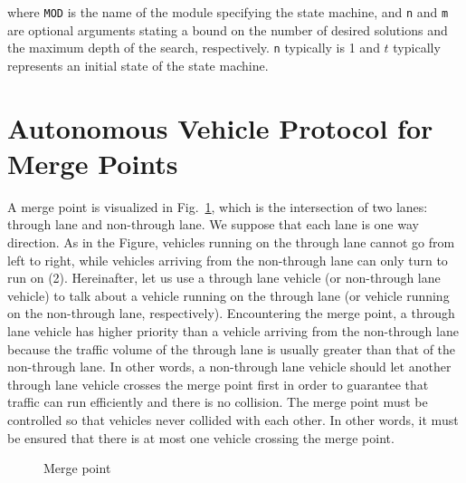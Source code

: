 \documentclass[10pt, conference, compsocconf]{IEEEtran}
\begin{document}
\noindent
where \verb!MOD! is the name of the module specifying the state
machine, and \verb!n! and \verb!m! are optional arguments stating a
bound on the number of desired solutions and the maximum depth of the
search, respectively.  \verb!n! typically is 1 and $t$ typically
represents an initial state of the state machine.

 

 
\section{Autonomous Vehicle Protocol for Merge Points}
 \label{sect_oriproto}
A merge point is visualized in Fig.~\ref{mergePoint_fig}, which is the intersection of two lanes: through lane and non-through lane.
We suppose that each lane is one way direction.
As in the Figure, vehicles running on the through lane cannot go from left to right, while vehicles arriving from the non-through lane can only turn to run on (2).
Hereinafter, let us use a through lane vehicle (or non-through lane vehicle) to talk about a vehicle running on the through lane (or vehicle running on the non-through lane, respectively). 
Encountering the merge point, a through lane vehicle has higher priority than a vehicle arriving from the non-through lane because the traffic volume of the through lane is usually greater than that of the non-through lane. 
In other words, a non-through lane vehicle should let another through lane vehicle crosses the merge point first in order to guarantee that traffic can run efficiently and there is no collision.
The merge point must be controlled so that vehicles never collided with each other. 
In other words, it must be ensured that there is at most one vehicle crossing the merge point.


\begin{figure}[h]
\begin{center}
\end{center}
\caption{Merge point}
\label{mergePoint_fig}
\end{figure}
\end{document}
